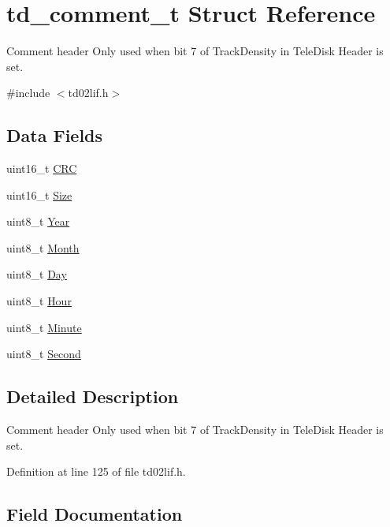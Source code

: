 \hypertarget{structtd__comment__t}{}\section{td\+\_\+comment\+\_\+t Struct Reference}
\label{structtd__comment__t}


Comment header Only used when bit 7 of Track\+Density in Tele\+Disk Header is set.  




{\ttfamily \#include $<$td02lif.\+h$>$}

\subsection*{Data Fields}
\begin{DoxyCompactItemize}
\item 
uint16\+\_\+t \hyperlink{structtd__comment__t_a4bcc6435d5a4408627be9f50ef124211}{C\+RC}
\item 
uint16\+\_\+t \hyperlink{structtd__comment__t_aca61f38ae62a6de2ff0eab7da2c25e11}{Size}
\item 
uint8\+\_\+t \hyperlink{structtd__comment__t_a0c804ec07303f411dd508dc64900aff5}{Year}
\item 
uint8\+\_\+t \hyperlink{structtd__comment__t_ac926fbfad0e3544bb45bb05b7cd66c49}{Month}
\item 
uint8\+\_\+t \hyperlink{structtd__comment__t_ab42475ed36aa4475f76336099fd53acc}{Day}
\item 
uint8\+\_\+t \hyperlink{structtd__comment__t_ae42f4895a24dadba8528e32d89d601c6}{Hour}
\item 
uint8\+\_\+t \hyperlink{structtd__comment__t_a40d01b0af51b4896e0d771e8a458ed87}{Minute}
\item 
uint8\+\_\+t \hyperlink{structtd__comment__t_ae89673be13e6cad1c83bd51034689248}{Second}
\end{DoxyCompactItemize}


\subsection{Detailed Description}
Comment header Only used when bit 7 of Track\+Density in Tele\+Disk Header is set. 

Definition at line 125 of file td02lif.\+h.



\subsection{Field Documentation}
\mbox{\label{structtd__comment__t_a4bcc6435d5a4408627be9f50ef124211}} 

